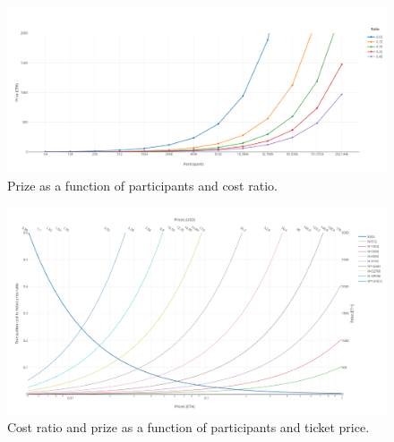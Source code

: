 \begin{figure}[htbp]
  \centering
  \includegraphics[width=\columnwidth]{figures/max_participants_prize.png}
  \caption{Prize as a function of participants and cost ratio.}
  \label{fig:prize-chart}
\end{figure}

\begin{figure}[htbp]
  \centering
  \includegraphics[width=\columnwidth]{figures/ticket_prices.png}
  \caption{Cost ratio and prize as a function of participants and ticket price.}
  \label{fig:price-chart}
\end{figure}
